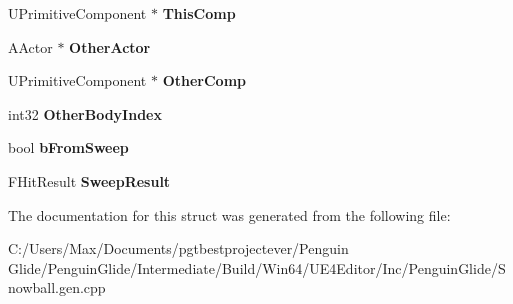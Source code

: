 \begin{DoxyCompactItemize}
\item 
\mbox{\label{struct_z___construct___u_function___a_snowball___on_comp_overlap___statics_1_1_snowball__event_on_comp_overlap___parms_a397574d7111800916ac3b3d596b2f62a}} 
U\+Primitive\+Component $\ast$ {\bfseries This\+Comp}
\item 
\mbox{\label{struct_z___construct___u_function___a_snowball___on_comp_overlap___statics_1_1_snowball__event_on_comp_overlap___parms_a2410577a8cebd3e0bd12716abb774845}} 
A\+Actor $\ast$ {\bfseries Other\+Actor}
\item 
\mbox{\label{struct_z___construct___u_function___a_snowball___on_comp_overlap___statics_1_1_snowball__event_on_comp_overlap___parms_a6d78d7bb278d067fc343de6b28d17395}} 
U\+Primitive\+Component $\ast$ {\bfseries Other\+Comp}
\item 
\mbox{\label{struct_z___construct___u_function___a_snowball___on_comp_overlap___statics_1_1_snowball__event_on_comp_overlap___parms_aa58e108d9bc3ce97e421c8d096b9179f}} 
int32 {\bfseries Other\+Body\+Index}
\item 
\mbox{\label{struct_z___construct___u_function___a_snowball___on_comp_overlap___statics_1_1_snowball__event_on_comp_overlap___parms_a806fd165c08d5365243eae5a9b51242e}} 
bool {\bfseries b\+From\+Sweep}
\item 
\mbox{\label{struct_z___construct___u_function___a_snowball___on_comp_overlap___statics_1_1_snowball__event_on_comp_overlap___parms_afe47ce0909061755d93c2ac5673dffeb}} 
F\+Hit\+Result {\bfseries Sweep\+Result}
\end{DoxyCompactItemize}


The documentation for this struct was generated from the following file\+:\begin{DoxyCompactItemize}
\item 
C\+:/\+Users/\+Max/\+Documents/pgtbestprojectever/\+Penguin Glide/\+Penguin\+Glide/\+Intermediate/\+Build/\+Win64/\+U\+E4\+Editor/\+Inc/\+Penguin\+Glide/Snowball.\+gen.\+cpp\end{DoxyCompactItemize}
